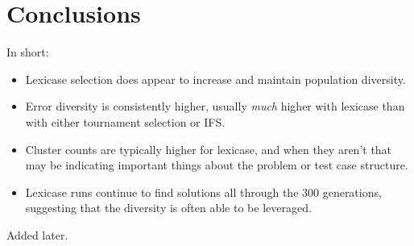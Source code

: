 \section{Conclusions}

In short:
\begin{itemize}
	\item Lexicase selection does appear to increase and maintain population diversity.
	\item Error diversity is consistently higher, usually \emph{much} higher with lexicase than
	with either tournament selection or IFS.
	\item Cluster counts are typically higher for lexicase, and when they aren't that may be
	indicating important things about the problem or test case structure.
	\item Lexicase runs continue to find solutions all through the 300 generations, suggesting
	that the diversity is often able to be leveraged.
\end{itemize}

\begin{acknowledgement}
Added later.
\end{acknowledgement}



